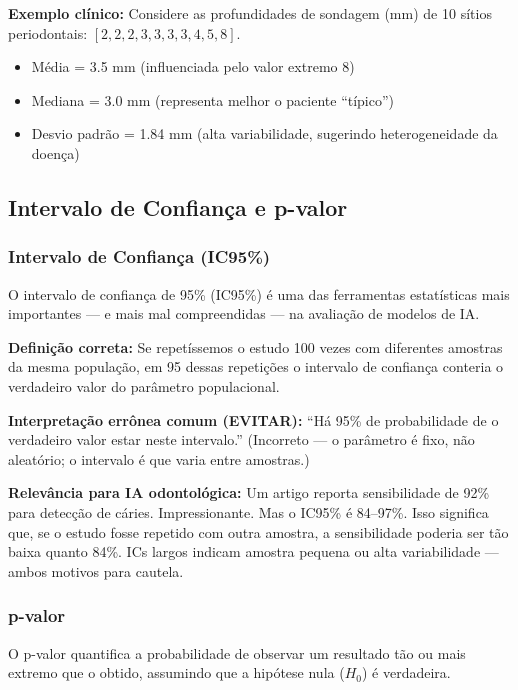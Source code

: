 \textbf{Exemplo clínico:} Considere as profundidades de sondagem (mm) de 10 sítios periodontais: $[2, 2, 2, 3, 3, 3, 3, 4, 5, 8]$.
\begin{itemize}
    \item Média = 3.5 mm (influenciada pelo valor extremo 8)
    \item Mediana = 3.0 mm (representa melhor o paciente ``típico'')
    \item Desvio padrão = 1.84 mm (alta variabilidade, sugerindo heterogeneidade da doença)
\end{itemize}

\subsection{Intervalo de Confiança e p-valor}

\subsubsection{Intervalo de Confiança (IC95\%)}

O intervalo de confiança de 95\% (IC95\%)  é uma das ferramentas estatísticas mais importantes — e mais mal compreendidas — na avaliação de modelos de IA.

\textbf{Definição correta:} Se repetíssemos o estudo 100 vezes com diferentes amostras da mesma população, em 95 dessas repetições o intervalo de confiança conteria o verdadeiro valor do parâmetro populacional.

\textbf{Interpretação errônea comum (EVITAR):} ``Há 95\% de probabilidade de o verdadeiro valor estar neste intervalo.'' (Incorreto — o parâmetro é fixo, não aleatório; o intervalo é que varia entre amostras.)

\textbf{Relevância para IA odontológica:} Um artigo reporta sensibilidade de 92\% para detecção de cáries. Impressionante. Mas o IC95\% é 84--97\%. Isso significa que, se o estudo fosse repetido com outra amostra, a sensibilidade poderia ser tão baixa quanto 84\%. ICs largos indicam amostra pequena ou alta variabilidade — ambos motivos para cautela.

\subsubsection{p-valor}

O p-valor  quantifica a probabilidade de observar um resultado tão ou mais extremo que o obtido, assumindo que a hipótese nula ($H_0$) é verdadeira.

